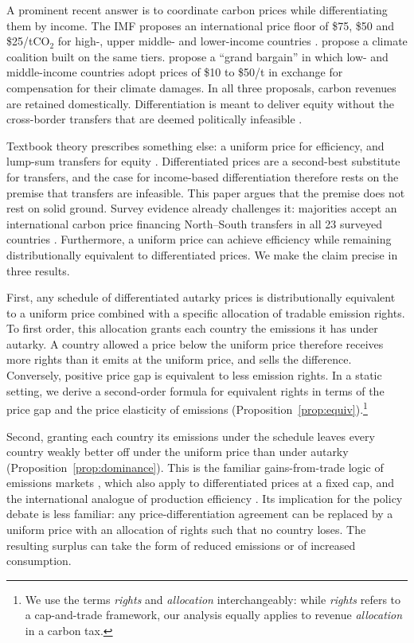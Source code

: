 \documentclass[12pt,english]{article}
\theoremstyle{remark}
\begin{document}
A prominent recent answer is to coordinate carbon prices while differentiating them by income. The IMF proposes an international price floor of \$75, \$50 and \$25/tCO$_2$ for high-, upper middle- and lower-income countries \citep{parry_proposal_2021}. \citet{wolfram_building_2025} propose a climate coalition built on the same tiers. \citet{banerjee_grand_2025} propose a ``grand bargain'' in which low- and middle-income countries adopt prices of \$10 to \$50/t in exchange for compensation for their climate damages. In all three proposals, carbon revenues are retained domestically. Differentiation is meant to deliver equity without the cross-border transfers that are deemed politically infeasible \citep{parry_proposal_2021}.

Textbook theory prescribes something else: a uniform price for efficiency, and lump-sum transfers for equity \citep{aldy_promise_2012}. Differentiated prices are a second-best substitute for transfers, and the case for income-based differentiation therefore rests on the premise that transfers are infeasible. This paper argues that the premise does not rest on solid ground. Survey evidence already challenges it: majorities accept an international carbon price financing North--South transfers in all 23 surveyed countries \citep{fabre_majority_2025,fabre_public_2025}.
Furthermore, a uniform price can achieve efficiency while remaining
distributionally equivalent to differentiated prices. We make the claim precise in three results.

First, any schedule of differentiated autarky prices is distributionally equivalent to a uniform price combined with a specific allocation of tradable emission rights. To first order, this allocation grants each country the emissions it has under autarky. A country allowed a price below the uniform price therefore receives more rights than it emits at the uniform price, and sells the difference.
Conversely,  positive price gap is equivalent to less emission rights.
In a static setting, we derive
a second-order formula for equivalent rights in terms of the price gap and the price elasticity of emissions (Proposition~\ref{prop:equiv}).\footnote{We use the terms \textit{rights} and \textit{allocation} interchangeably: while \textit{rights} refers to a cap-and-trade framework, our analysis equally applies to revenue \textit{allocation} in a carbon tax.}

Second, granting each country its emissions under the schedule leaves every country weakly better off under the uniform price than under autarky (Proposition~\ref{prop:dominance}). This is the familiar gains-from-trade logic of emissions markets \citep{montgomery_markets_1972}, which \citet{fleurbaey_when_2025} also apply to differentiated prices at a fixed cap, and the international analogue of production efficiency \citep{diamond_optimal_1971}. Its implication for the policy debate is less familiar: any price-differentiation agreement can be replaced by a uniform price with an allocation of rights such that no country loses. The resulting surplus can take the form of reduced emissions or of increased consumption.
\end{document}
